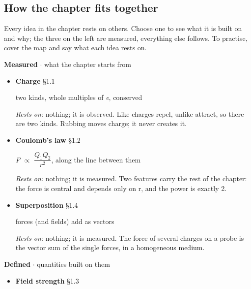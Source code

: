 \documentclass[11pt]{article}
\begin{document}
\begin{keepsection}
\section{How the chapter fits together}

Every idea in the chapter rests on others. Choose one to see what it is built on and why; the three on the left are measured, everything else follows. To practise, cover the map and say what each idea rests on.

\textbf{Measured} \ensuremath{\cdot} what the chapter starts from

\begin{itemize}
\item {}
\textbf{Charge} \hfill{\small\color{FAUblue}§1.1}

two kinds, whole multiples of \textit{e}, conserved

\emph{Rests on:} nothing; it is observed. Like charges repel, unlike attract, so there are two kinds. Rubbing moves charge; it never creates it.
\item {}
\textbf{Coulomb’s law} \hfill{\small\color{FAUblue}§1.2}

\textit{F} \ensuremath{\propto} {\small\ensuremath{\dfrac{{Q}_{1}{Q}_{2}}{{r}^{2}}}}, along the line between them

\emph{Rests on:} nothing; it is measured. Two features carry the rest of the chapter: the force is central and depends only on r, and the power is exactly 2.
\item {}
\textbf{Superposition} \hfill{\small\color{FAUblue}§1.4}

forces (and fields) add as vectors

\emph{Rests on:} nothing; it is measured. The force of several charges on a probe is the vector sum of the single forces, in a homogeneous medium.
\end{itemize}

\textbf{Defined} \ensuremath{\cdot} quantities built on them

\begin{itemize}
\item {}
\textbf{Field strength} \hfill{\small\color{FAUblue}§1.3}


\end{itemize}
\end{keepsection}
\end{document}

